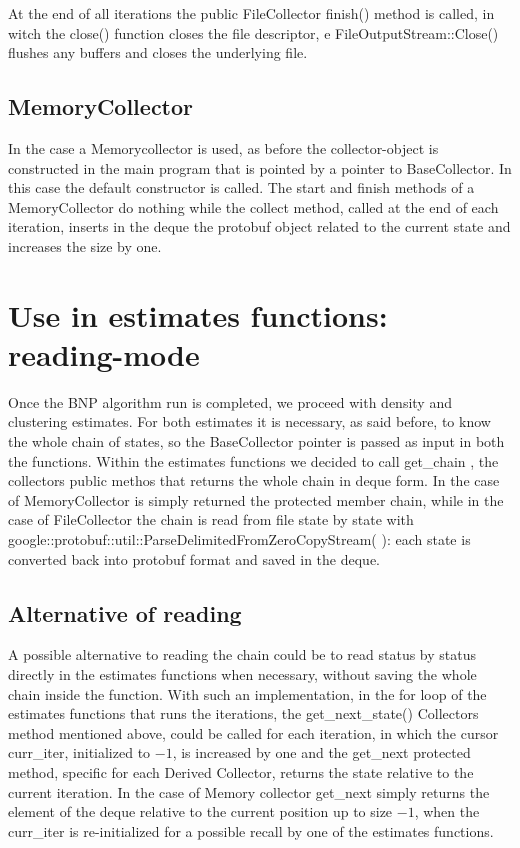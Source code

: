 At the end of all iterations the public FileCollector finish() method is called, in witch the close() function closes the file descriptor, e FileOutputStream::Close() flushes any buffers and closes the underlying file.

\subsection{MemoryCollector}
In the case a Memorycollector is used, as before the collector-object is constructed in the main program that is pointed by a pointer to BaseCollector. In this case the default constructor is called.  The start and finish methods of a MemoryCollector do nothing while the collect method, called at the end of each iteration, inserts in the deque the protobuf object related to the current state and increases the size by one.

\section{Use in estimates functions: reading-mode}
Once the BNP algorithm run is completed, we proceed with density and clustering estimates. For both estimates it is necessary, as said before, to know the whole chain of states, so the BaseCollector pointer is passed as input in both the functions. Within the estimates functions we decided to call get\_chain , the collectors public methos that returns the whole chain in deque form. In the case of MemoryCollector is simply returned the  protected member chain, while in the case of FileCollector the chain is read from file state by state with google::protobuf::util::ParseDelimitedFromZeroCopyStream( ): each state is converted back into protobuf format and saved in the deque.

\subsection{Alternative of reading}

A possible alternative to reading the chain could be to read status by status directly in the estimates functions when necessary, without saving the whole chain inside the function. 
With such an implementation, in the for loop of the estimates functions that runs the iterations, the get\_next\_state() Collectors method mentioned above,  could be called for each iteration, in which the cursor curr\_iter, initialized to $-1$, is increased by one and the get\_next protected method, specific for each Derived Collector, returns the state relative to the current iteration. 
In the case of Memory collector get\_next simply returns the element of the deque relative to the current position up to size $-1$, when the curr\_iter is re-initialized for a possible recall by one of the estimates functions.

